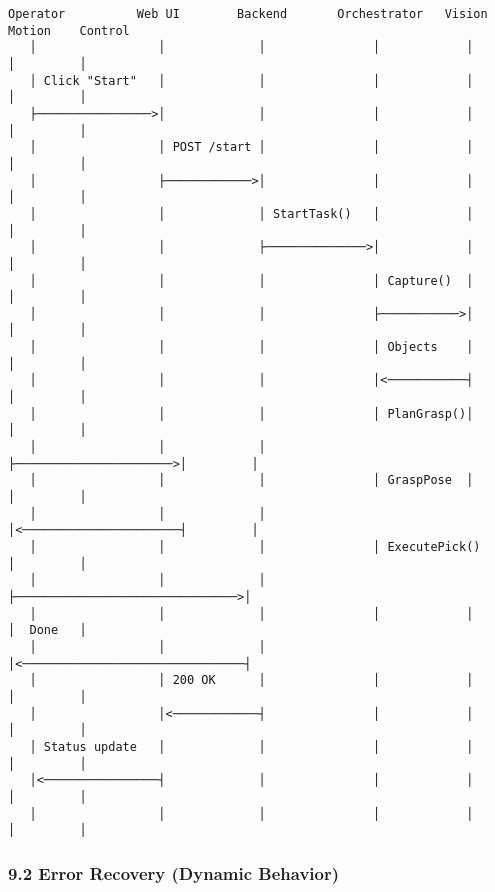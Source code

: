 \documentclass[
]{article}
\begin{document}
\begin{verbatim}
Operator          Web UI        Backend       Orchestrator   Vision    Motion    Control
   │                 │             │               │            │         │         │
   │ Click "Start"   │             │               │            │         │         │
   ├────────────────>│             │               │            │         │         │
   │                 │ POST /start │               │            │         │         │
   │                 ├────────────>│               │            │         │         │
   │                 │             │ StartTask()   │            │         │         │
   │                 │             ├──────────────>│            │         │         │
   │                 │             │               │ Capture()  │         │         │
   │                 │             │               ├───────────>│         │         │
   │                 │             │               │ Objects    │         │         │
   │                 │             │               │<───────────┤         │         │
   │                 │             │               │ PlanGrasp()│         │         │
   │                 │             │               ├──────────────────────>│         │
   │                 │             │               │ GraspPose  │         │         │
   │                 │             │               │<──────────────────────┤         │
   │                 │             │               │ ExecutePick()         │         │
   │                 │             │               ├───────────────────────────────>│
   │                 │             │               │            │         │  Done   │
   │                 │             │               │<───────────────────────────────┤
   │                 │ 200 OK      │               │            │         │         │
   │                 │<────────────┤               │            │         │         │
   │ Status update   │             │               │            │         │         │
   │<────────────────┤             │               │            │         │         │
   │                 │             │               │            │         │         │
\end{verbatim}

\hypertarget{error-recovery-dynamic-behavior}{%
\subsubsection{9.2 Error Recovery (Dynamic
Behavior)}\label{error-recovery-dynamic-behavior}}
\end{document}
